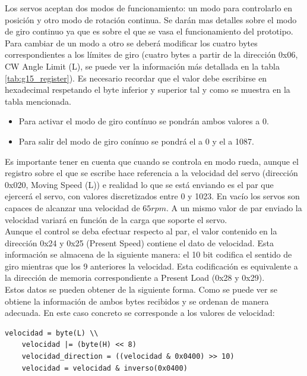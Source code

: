 		Los servos aceptan dos modos de funcionamiento: un modo para controlarlo en posición y otro modo de rotación continua. Se darán mas detalles sobre el modo de giro continuo ya que es sobre el que se vasa el funcionamiento del prototipo.
		\\

		Para cambiar de un modo a otro se deberá modificar los cuatro bytes correspondientes a los límites de giro (cuatro bytes a partir de la dirección 0x06, CW Angle Limit (L), se puede ver la información más detallada en la tabla \ref{tab:g15_register}). Es necesario recordar que el valor debe escribirse en hexadecimal respetando el byte inferior y superior tal y como se muestra en la tabla mencionada.

		\begin{itemize}
			\item Para activar el modo de giro contínuo se pondrán ambos valores a 0.
			\item Para salir del modo de giro conínuo se pondrá el  a 0 y el  a 1087.
		\end{itemize}

		Es importante tener en cuenta que cuando se controla en modo rueda, aunque el registro sobre el que se escribe hace referencia a la velocidad del servo (dirección 0x020, Moving Speed (L)) e realidad lo que se está enviando es el par que ejercerá el servo, con valores discretizados entre 0 y 1023. En vacío los servos son capaces de alcanzar una velocidad de $65rpm$. A un mismo valor de par enviado la velocidad variará en función de la carga que soporte el servo.
		\\

		Aunque el control se deba efectuar respecto al par, el valor contenido en la dirección 0x24 y 0x25 (Present Speed) contiene el dato de velocidad. Esta información se almacena de la siguiente manera: el 10 bit codifica el sentido de giro mientras que los 9 anteriores la velocidad. Esta codificación es equivalente a la dirección de memoria correspondiente a Present Load (0x28 y 0x29).
		\\

		Estos datos se pueden obtener de la siguiente forma. Como se puede ver se obtiene la información de ambos bytes recibidos y se ordenan de manera adecuada. En este caso concreto se corresponde a los valores de velocidad:
		\begin{lstlisting}[frame=single]
	velocidad = byte(L) \\
	velocidad |= (byte(H) << 8)
	velocidad_direction = ((velocidad & 0x0400) >> 10)
	velocidad = velocidad & inverso(0x0400)
		\end{lstlisting}

